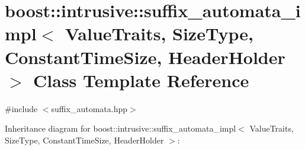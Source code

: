 \hypertarget{classboost_1_1intrusive_1_1suffix__automata__impl}{}\section{boost\+:\+:intrusive\+:\+:suffix\+\_\+automata\+\_\+impl$<$ Value\+Traits, Size\+Type, Constant\+Time\+Size, Header\+Holder $>$ Class Template Reference}
\label{classboost_1_1intrusive_1_1suffix__automata__impl}


{\ttfamily \#include $<$suffix\+\_\+automata.\+hpp$>$}



Inheritance diagram for boost\+:\+:intrusive\+:\+:suffix\+\_\+automata\+\_\+impl$<$ Value\+Traits, Size\+Type, Constant\+Time\+Size, Header\+Holder $>$\+:
